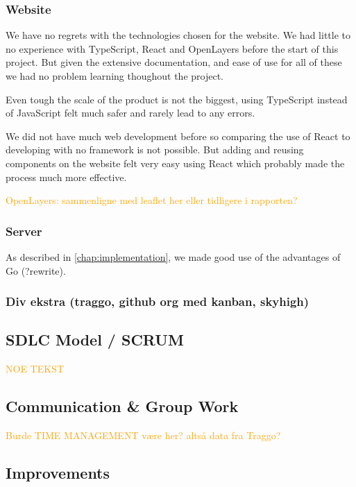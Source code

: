 \subsubsection{Website}

We have no regrets with the technologies chosen for the website. We had little to no experience with TypeScript, React and OpenLayers before the start of this project. But given the extensive documentation, and ease of use for all of these we had no problem learning thoughout the project. 

Even tough the scale of the product is not the biggest, using TypeScript instead of JavaScript felt much safer and rarely lead to any errors. 

We did not have much web development before so comparing the use of React to developing with no framework is not possible. But adding and reusing components on the website felt very easy using React which probably made the process much more effective.

\textcolor{orange}{OpenLayers: sammenligne med leaflet her eller tidligere i rapporten?}

\subsubsection{Server}

As described in \autoref{chap:implementation}, we made good use of the advantages of Go (?rewrite). 

\subsubsection{Div ekstra (traggo, github org med kanban, skyhigh)}

\subsection{SDLC Model / SCRUM}

\textcolor{orange}{NOE TEKST}

\subsection{Communication \& Group Work}

\textcolor{orange}{Burde TIME MANAGEMENT være her? altså data fra Traggo?}

\subsection{Improvements}

